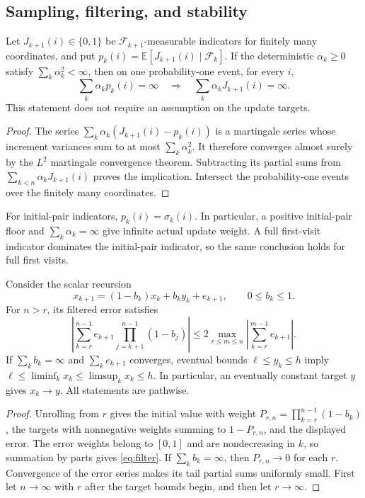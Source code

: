 \subsection{Sampling, filtering, and stability}
\begin{lemma}\label{lem:actual}
Let $J_{k+1}(i)\in\{0,1\}$ be $\mathcal F_{k+1}$-measurable indicators for finitely many coordinates, and put $p_k(i)=\mathbb E[J_{k+1}(i)\mid\mathcal F_k]$. If the
deterministic $\alpha_k\ge0$ satisfy $\sum_k\alpha_k^2<\infty$, then on one probability-one event, for every $i$,
\begin{equation}\label{eq:actual}
\sum_k\alpha_kp_k(i)=\infty\quad\Longrightarrow\quad\sum_k\alpha_kJ_{k+1}(i)=\infty.
\end{equation}
This statement does not require an assumption on the update targets.
\end{lemma}
\begin{proof}
The series $\sum_k\alpha_k(J_{k+1}(i)-p_k(i))$ is a martingale series whose increment variances
sum to at most $\sum_k\alpha_k^2$. It therefore converges almost surely by the $L^2$ martingale convergence
theorem. Subtracting its partial sums from $\sum_{k<n}\alpha_kJ_{k+1}(i)$ proves the implication. Intersect
the probability-one events over the finitely many coordinates.
\end{proof}

For initial-pair indicators, $p_k(i)=\sigma_k(i)$. In particular, a positive initial-pair floor and
$\sum_k\alpha_k=\infty$ give infinite actual update weight. A full first-visit indicator dominates the
initial-pair indicator, so the same conclusion holds for full first visits.

\begin{lemma}\label{lem:filter}
Consider the scalar recursion
\[
x_{k+1}=(1-b_k)x_k+b_ky_k+e_{k+1},\qquad0\le b_k\le1.
\]
For $n>r$, its filtered error satisfies
\begin{equation}\label{eq:filter}
\left|\sum_{k=r}^{n-1}e_{k+1}\prod_{j=k+1}^{n-1}(1-b_j)\right|
\le2\max_{r\le m\le n}\left|\sum_{k=r}^{m-1}e_{k+1}\right|.
\end{equation}
If $\sum_kb_k=\infty$ and $\sum_ke_{k+1}$ converges, eventual bounds $\ell\le y_k\le h$ imply $\ell\le\liminf_kx_k\le
\limsup_kx_k\le h$. In particular, an eventually constant target $y$ gives $x_k\to y$. All statements
are pathwise.
\end{lemma}
\begin{proof}
Unrolling from $r$ gives the initial value with weight $P_{r,n}=\prod_{k=r}^{n-1}(1-b_k)$, the targets
with nonnegative weights summing to $1-P_{r,n}$, and the displayed error. The error weights
belong to $[0,1]$ and are nondecreasing in $k$, so summation by parts gives \eqref{eq:filter}. If $\sum_kb_k=\infty$,
then $P_{r,n}\to0$ for each $r$. Convergence of the error series makes its tail partial sums uniformly
small. First let $n\to\infty$ with $r$ after the target bounds begin, and then let $r\to\infty$.
\end{proof}

